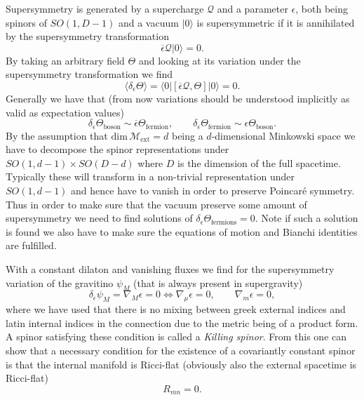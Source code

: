 Supersymmetry is generated by a supercharge $\mathcal{Q}$ and a parameter $\epsilon$, both being spinors of $SO(1,D-1)$ and a vacuum $|0\rangle$ is supersymmetric if it is annihilated by the supersymmetry transformation
\begin{equation}
    \overbar{\epsilon}\mathcal{Q}|0\rangle = 0.
\end{equation}
By taking an arbitrary field $\Theta$ and looking at its variation under the supersymmetry transformation we find 
\begin{equation}
    \langle \delta_{\epsilon}\Theta\rangle = \langle 0|\left[\overbar{\epsilon}\mathcal{Q},\Theta\right]|0\rangle = 0.
\end{equation}
Generally we have that (from now variations should be understood implicitly as valid as expectation values)
\begin{equation}
    \delta_\epsilon \Theta_{\text{boson}} \sim \overbar{\epsilon}\Theta_{\text{fermion}},\qquad \delta_\epsilon \Theta_{\text{fermion}}\sim \epsilon\Theta_{\text{boson}}.
\end{equation}
By the assumption that $\text{dim}\,\mathcal{M}{_{\text{ext}}}=d$ being a $d$-dimensional Minkowski space we have to decompose the spinor representations under $SO(1,d-1)\times SO(D-d)$ where $D$ is the dimension of the full spacetime. Typically these will transform in a non-trivial representation under $SO(1,d-1)$ and hence have to vanish in order to preserve Poincaré symmetry. Thus in order to make sure that the vacuum preserve some amount of supersymmetry we need to find solutions of $\delta_\epsilon\Theta_{\text{fermions}}=0$. Note if such a solution is found we also have to make sure the equations of motion and Bianchi identities are fulfilled. 

With a constant dilaton and vanishing fluxes we find for the supersymmetry variation of the gravitino $\psi_M$ (that is always present in supergravity)
\begin{equation}
    \delta_\epsilon\psi_M = \nabla_M\epsilon = 0 \Leftrightarrow \nabla_\mu \epsilon = 0,\qquad \nabla_m\epsilon = 0,
\end{equation}
where we have used that there is no mixing between greek external indices and latin internal indices in the connection due to the metric being of a product form. A spinor satisfying these condition is called a \emph{Killing spinor}. From this one can show that a necessary condition for the existence of a covariantly constant spinor is that the internal manifold is Ricci-flat (obviously also the external spacetime is Ricci-flat)
\begin{equation}
    R_{mn} = 0.
\end{equation}

